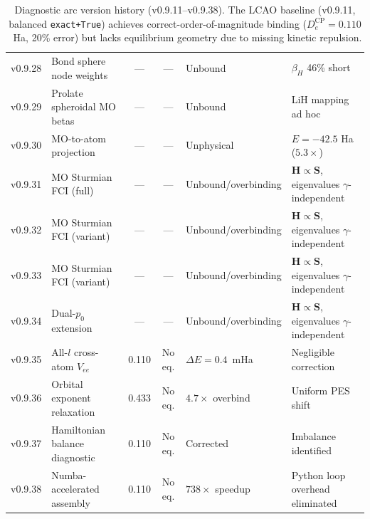 \documentclass[aps,pra,twocolumn,superscriptaddress,longbibliography]{revtex4-2}
\begin{document}
\begin{table}[t]
\begin{tabular}{llccll}
v0.9.28 & Bond sphere node weights
  & --- & --- & Unbound & $\beta_H$ 46\% short \\
v0.9.29 & Prolate spheroidal MO betas
  & --- & --- & Unbound & LiH mapping ad hoc \\
v0.9.30 & MO-to-atom projection
  & --- & --- & Unphysical & $E=-42.5$ Ha ($5.3\times$) \\
v0.9.31 & MO Sturmian FCI (full)
  & --- & --- & Unbound/overbinding & $\mathbf{H}\!\propto\!\mathbf{S}$, eigenvalues $\gamma$-independent \\
v0.9.32 & MO Sturmian FCI (variant)
  & --- & --- & Unbound/overbinding & $\mathbf{H}\!\propto\!\mathbf{S}$, eigenvalues $\gamma$-independent \\
v0.9.33 & MO Sturmian FCI (variant)
  & --- & --- & Unbound/overbinding & $\mathbf{H}\!\propto\!\mathbf{S}$, eigenvalues $\gamma$-independent \\
v0.9.34 & Dual-$p_0$ extension
  & --- & --- & Unbound/overbinding & $\mathbf{H}\!\propto\!\mathbf{S}$, eigenvalues $\gamma$-independent \\
v0.9.35 & All-$l$ cross-atom $V_{ee}$
  & 0.110 & No eq. & $\Delta E = 0.4$~mHa & Negligible correction \\
v0.9.36 & Orbital exponent relaxation
  & 0.433 & No eq. & $4.7\times$ overbind & Uniform PES shift \\
v0.9.37 & Hamiltonian balance diagnostic
  & 0.110 & No eq. & Corrected & Imbalance identified \\
v0.9.38 & Numba-accelerated assembly
  & 0.110 & No eq. & $738\times$ speedup & Python loop overhead eliminated \\
\bottomrule
\end{tabular}
\caption{Diagnostic arc version history (v0.9.11--v0.9.38).
The LCAO baseline (v0.9.11, balanced \texttt{exact+True}) achieves
correct-order-of-magnitude binding ($D_e^{\mathrm{CP}} = 0.110$~Ha,
20\% error) but lacks equilibrium geometry due to missing kinetic
repulsion.}
\label{tab:versions}
\end{table}

\end{document}
